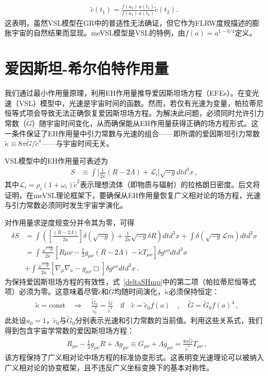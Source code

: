 \documentclass[jkps,preprint,fleqn]{revtex4}
\newcommand{\tc}{\tilde{c}}
\newcommand{\tG}{\tilde{G}}
\newcommand{\tkapp}{\tilde{\kappa}}
\begin{document}
\begin{align} \tc(t_1) = \frac{f(a_2)}{f(a_1)} \frac{a(t_1)}{a(t_2)} \tc(t_2) \label{cVSL}. \end{align}这表明，虽然VSL模型在GR中的普适性无法确证，但它作为FLRW度规描述的膨胀宇宙的自然结果而显现。meVSL模型是VSL的特例，由$f(a) = a^{1-b/4}$定义\cite{Lee:2020zts,Lee:2023bjz}。
\section{爱因斯坦-希尔伯特作用量}\label{sec:HEaction}

我们通过最小作用量原理，利用EH作用量推导爱因斯坦场方程（EFEs）。在变光速（VSL）模型中，光速是宇宙时间的函数。然而，若仅有光速为变量，帕拉蒂尼恒等式项会导致无法正确恢复爱因斯坦场方程。为解决此问题，必须同时允许引力常数（$\tG$）随宇宙时间变化，从而确保能从EH作用量获得正确的场方程形式\cite{Lee:2020zts}。这一条件保证了EH作用量中引力常数与光速的组合——即所谓的爱因斯坦引力常数$\tkapp \equiv 8 \pi \tG/\tc^4$——与宇宙时间无关。

VSL模型中的EH作用量可表述为
\begin{align} S &\equiv \int \Biggl[ \frac{1}{2 \tkapp} \left( R - 2 \Lambda \right) + \mathcal{L}_i \Biggr] \sqrt{-g} dt d^3x \label{SHmp} \,, \end{align}
其中$\mathcal{L}_i = \rho_i (1 + \omega_i) \tc^2$表示理想流体（即物质与辐射）的拉格朗日密度。后文将证明，在meVSL理论框架下，要确保从EH作用量恢复广义相对论的场方程，光速与引力常数必须同时发生宇宙学演化。

对作用量求逆度规变分并令其为零，可得
\begin{align} \delta S &= \int \left( \left[ \frac{\left( R - 2 \Lambda \right)}{2 \tkapp} \right] \delta \left( \sqrt{-g} \right)  + \frac{1}{2\tkapp} \sqrt{-g} \delta R \right) dt d^3 x + \int \delta \left( \sqrt{-g} \mathcal{L}{m} \right) dt d^3 x \nonumber \\ &= \int \frac{\sqrt{-g}}{2 \tkapp} \left[ R{\mu\nu} - \frac{1}{2} g_{\mu\nu} \left( R - 2 \Lambda \right) - \tkapp T_{\mu\nu} \right] \delta g^{\mu\nu} dtd^3 x \nonumber \\ &+ \int \frac{\sqrt{-g}}{2 \tkapp} \left[ \nabla_{\mu} \nabla_{\nu} - g_{\mu\nu} \Box \right] \delta g^{\mu\nu} dtd^3 x \label{deltaSHmp} \,. \end{align}
为保持爱因斯坦场方程的有效性，式~\eqref{deltaSHmp}中的第二项（帕拉蒂尼恒等式项）必须为零。这意味着尽管$\tc$和$\tG$均随时间演化，$\tkapp$必须保持恒定：
\begin{align}
&\tkapp = \text{const} \quad \Rightarrow \quad \frac{\tG_0}{\tc_0^4} = \frac{\tG}{\tc^4} \quad \textrm{if} \quad \tc = \tc_0 f(a) \quad , \quad \tG = \tG_{0} f(a)^4 \label{tkappaconstmp} \,,
\end{align}
此处设$a_0 = 1$，$\tc_0$与$\tG_0$分别表示光速和引力常数的当前值。利用这些关系式，我们得到包含宇宙学常数的爱因斯坦场方程：
\begin{align} &R_{\mu\nu} - \frac{1}{2} g_{\mu\nu} R + \Lambda g_{\mu\nu} \equiv G_{\mu\nu} + \Lambda g_{\mu\nu}  = \frac{8 \pi \tG}{\tc^4} T_{\mu\nu} \label{tEFEmp} \,, \end{align}
该方程保持了广义相对论中场方程的标准协变形式。这表明变光速理论可以被纳入广义相对论的协变框架，且不违反广义坐标变换下的基本对称性。
\end{document}
